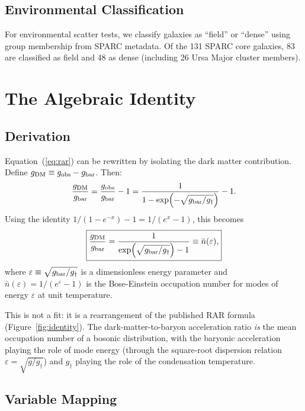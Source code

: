 \documentclass[twocolumn,twocolappendix]{aastex631}
\newcommand{\gbar}{g_{\rm bar}}
\newcommand{\gobs}{g_{\rm obs}}
\newcommand{\gdm}{g_{\rm DM}}
\newcommand{\gdag}{g_{\dagger}}
\newcommand{\nbar}{\bar{n}}
\begin{document}
\subsection{Environmental Classification} \label{sec:env_class}

For environmental scatter tests, we classify galaxies as ``field'' or
``dense'' using group membership from SPARC metadata. Of the 131 SPARC core
galaxies, 83 are classified as field and 48 as dense (including 26 Ursa
Major cluster members).

\section{The Algebraic Identity} \label{sec:identity}

\subsection{Derivation}

Equation~(\ref{eq:rar}) can be rewritten by isolating the dark matter
contribution. Define $\gdm \equiv \gobs - \gbar$. Then:
\begin{equation}\label{eq:gdm_ratio}
    \frac{\gdm}{\gbar} = \frac{\gobs}{\gbar} - 1
    = \frac{1}{1 - \exp\!\left(-\sqrt{\gbar/\gdag}\right)} - 1.
\end{equation}
Using the identity $1/(1-e^{-x}) - 1 = 1/(e^x - 1)$, this becomes
\begin{equation}\label{eq:be_identity}
    \boxed{\frac{\gdm}{\gbar}
    = \frac{1}{\exp\!\left(\sqrt{\gbar/\gdag}\right) - 1}
    \equiv \nbar(\varepsilon),}
\end{equation}
where $\varepsilon \equiv \sqrt{\gbar/\gdag}$ is a dimensionless energy
parameter and $\nbar(\varepsilon) = 1/(e^{\varepsilon} - 1)$ is the
Bose-Einstein occupation number for modes of energy $\varepsilon$ at unit
temperature.

This is not a fit: it is a rearrangement of the published RAR formula
(Figure~\ref{fig:identity}). The dark-matter-to-baryon acceleration ratio
\emph{is} the mean occupation number of a bosonic distribution, with the
baryonic acceleration playing the role of mode energy (through the
square-root dispersion relation $\varepsilon = \sqrt{g/\gdag}$) and $\gdag$
playing the role of the condensation temperature.

\subsection{Variable Mapping}
\end{document}
